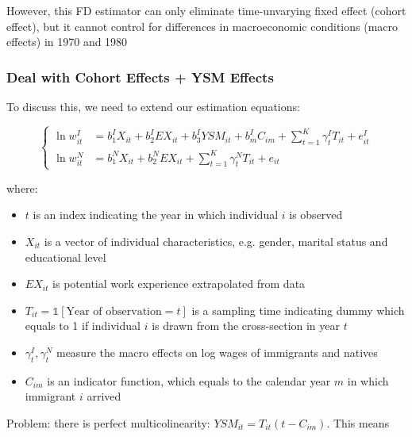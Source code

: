             However, this FD estimator can only eliminate time-unvarying fixed effect (cohort effect), but it cannot control for differences in macroeconomic conditions (macro effects) in 1970 and 1980

        
        \subsubsection{Deal with Cohort Effects + YSM Effects}

            To discuss this, we need to extend our estimation equations:

            \[
            \begin{cases}
            \ln w_{it}^I & = b_{1}^IX_{it} + b_{2}^IEX_{it} + b_{3}^IYSM_{it} + b_{m}^IC_{im} + \sum_{ t=1 }^{ K }\gamma_{t}^IT_{it} + e_{it}^I \\
            \ln w_{it}^N & = b_{1}^NX_{it} + b_{2}^NEX_{it} + \sum_{ t=1 }^{ K }\gamma_{t}^NT_{it} + e_{it}
            \end{cases}
            \]

            where:

            \begin{itemize}
                \item $t$ is an index indicating the year in which individual $i$ is observed
                \item $X_{it}$ is a vector of individual characteristics, e.g. gender, marital status and educational level
                \item $EX_{it}$ is potential work experience extrapolated from data
                \item $T_{it}=\mathds{1}[\text{Year of observation}=t]$ is a sampling time indicating dummy which equals to 1 if individual $i$ is drawn from the cross-section in year $t$
                \item $\gamma_{t}^I,\gamma_{t}^N$ measure the macro effects on log wages of immigrants and natives
                \item $C_{im}$ is an indicator function, which equals to the calendar year $m$ in which immigrant $i$ arrived
            \end{itemize}

            Problem: there is perfect multicolinearity: $YSM_{it}= T_{it}(t-C_{im})$. This means 

